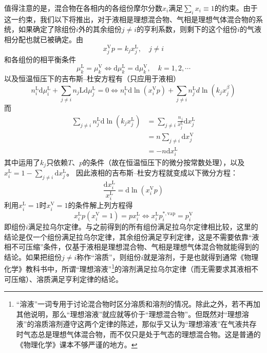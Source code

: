 \documentclass[main.tex]{subfiles}
\begin{document}
值得注意的是，混合物在各相内的各组份摩尔分数$x_i$满足$\sum_ix_i\equiv 1$的约束。由于这一约束，我们以下将推出，对于液相是理想混合物、气相是理想气体混合物的系统，如果确定了除组份$i$外的其余组份$j\neq i$的亨利系数，则剩下的这个组份$i$的气液相分配也就已被确定。由
\[x_j^\text{V}p=k_jx_j^\text{L},\quad j\neq i\]
和各组份的相平衡条件
\[\mu_k^\text{L}=\mu_k^\text{V}\Leftrightarrow \mathrm{d}\mu_k^\text{L}=\mathrm{d}\mu_k^\text{V},\quad k=1,2,\cdots\]
以及恒温恒压下的吉布斯--杜安方程有（只应用于液相）
\[
  n_i^\text{L}\mathrm{d}\mu_i^\text{L}+\sum_{j\neq i}n_j\text{L}\mathrm{d}\mu_j^\text{L}=0\Leftrightarrow n_i^\text{L}\mathrm{d}\ln\left(x_i^\text{V}p\right)+\sum_{j\neq i}n_j^\text{L}d\ln\left(k_jx_j^\beta\right)
\]
而
\begin{align*}
  \sum_{j\neq i}n_j^\text{L}\mathrm{d}\ln\left(k_j x_j^\text{L}\right) & =\sum_{j\neq i}\frac{n_j}{x_j^\text{L}}\mathrm{d}x_j^\text{L} \\
                                                                       & =n\sum_{j\neq i}\mathrm{d}x_j^\text{V}                        \\
                                                                       & =-n\mathrm{d}x_i^\text{L}
\end{align*}
其中运用了$k_j$只依赖$T$、$p$的条件（故在恒温恒压下的微分按常数处理），以及$x_i^\text{L}=1-\sum_{j\neq i}\mathrm{d}x_j^\text{L}$。
因此液相的吉布斯--杜安方程就变成以下微分方程：
\[\frac{\mathrm{d}x_i^\text{L}}{x_i^\text{L}}=\mathrm{d}\ln\left(x_i^\text{V}p\right)\]
利用$x_i^\text{L}=1$时$x_i^\text{V}=1$的条件解上列方程得
\[x_i^\text{L}p\left(x_i^\text{V}= 1\right)=p x_i^\text{L}\Leftrightarrow x_i^\text{L}p_i^{*,\text{vap}}=p^\text{V}_i\]
即组份$i$满足拉乌尔定律。与之前得到的所有组份满足拉乌尔定律相比较，这里的结论是仅一个组份满足拉乌尔定律，其余组份满足亨利定律，这是不需要依靠“液相不可压缩”条件，仅基于液相是理想混合物、气相是理想气体混合物就能得到的结论。如果把组份$j\neq i$称作“溶质”，则组份$i$就是溶剂，于是也就得到通常《物理化学》教科书中，所谓“理想溶液”\footnote{“溶液”一词专用于讨论混合物时区分溶质和溶剂的情况。除此之外，若不再加其他说明，那么“理想溶液”就应就等价于“理想混合物”。但既然对“理想溶液”的溶质溶剂遵守这两个定律的陈述，那似乎又认为“理想溶液”在气液共存时气态总是理想气体混合物，而不仅只是处于气态的理想混合物。这是普通的《物理化学》课本不够严谨的地方。}的溶剂满足拉乌尔定律（而无需要求其液相不可压缩）、溶质满足亨利定律的结论。
\end{document}
